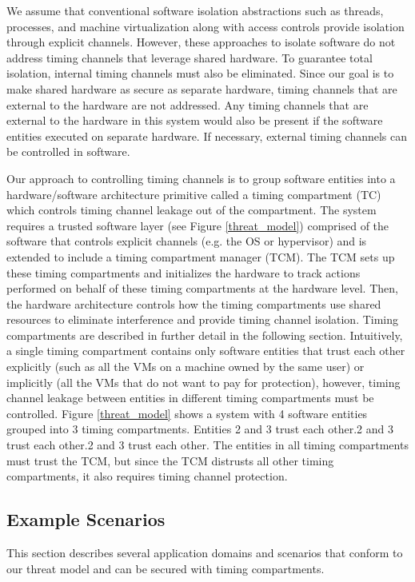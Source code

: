 We assume that conventional software isolation abstractions such as threads, 
processes, and machine virtualization along with access controls provide 
isolation through explicit channels. However, these approaches to isolate 
software do not address timing channels that leverage shared hardware. To 
guarantee total isolation, internal timing channels must also be eliminated.  
Since our goal is to make shared hardware as secure as separate hardware, 
timing channels that are external to the hardware are not addressed. Any timing 
channels that are external to the hardware in this system would also be present 
if the software entities executed on separate hardware. If necessary, external 
timing channels can be controlled in software.

Our approach to controlling timing channels is to group software entities
into a hardware/software architecture primitive called a timing compartment 
(TC) which controls timing channel leakage out of the compartment. The system 
requires a trusted software layer (see Figure \ref{threat_model}) comprised of 
the software that controls explicit channels (e.g.  the OS or hypervisor) and 
is extended to include a timing compartment manager (TCM). The TCM sets up 
these timing compartments and initializes the hardware to track actions 
performed on behalf of these timing compartments at the hardware level. Then, 
the hardware architecture controls how the timing compartments use shared 
resources to eliminate interference and provide timing channel isolation.  
Timing compartments are described in further detail in the following section.  
Intuitively, a single timing compartment contains only software entities that 
trust each other explicitly (such as all the VMs on a machine owned by the same 
user) or implicitly (all the VMs that do not want to pay for protection), 
however, timing channel leakage between entities in different timing 
compartments must be controlled. Figure \ref{threat_model} shows a system with 
4 software entities grouped into 3 timing compartments. Entities 2 and 3 trust 
each other.2 and 3 trust each other.2 and 3 trust each other. The entities in 
all timing compartments must trust the TCM, but since the TCM distrusts all 
other timing compartments, it also requires timing channel protection.

\subsection{Example Scenarios}
This section describes several application domains and scenarios that conform 
to our threat model and can be secured with timing compartments.

